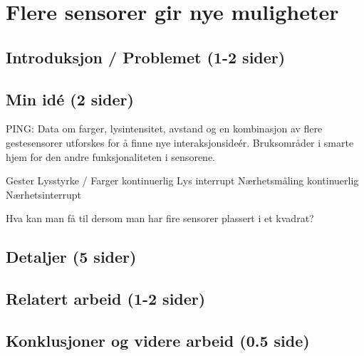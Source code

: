 \section{Flere sensorer gir nye muligheter}
\subsection{Introduksjon / Problemet (1-2 sider)}

\subsection{Min idé (2 sider)}
{\color{red}PING: Data om farger, lysintensitet, avstand og en kombinasjon av flere gestesensorer utforskes for å finne nye interaksjonsideér.}
Bruksområder i smarte hjem for den andre funksjonaliteten i sensorene.

Gester
Lysstyrke / Farger kontinuerlig
Lys interrupt
Nærhetsmåling kontinuerlig
Nærhetsinterrupt

Hva kan man få til dersom man har fire sensorer plassert i et kvadrat?

\subsection{Detaljer (5 sider)}

\subsection{Relatert arbeid (1-2 sider)}

\subsection{Konklusjoner og videre arbeid (0.5 side)}
